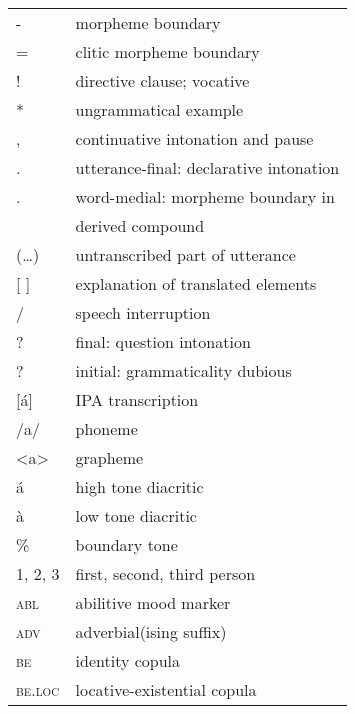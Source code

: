 \label{sec:abbr}
\begin{tabularx}{.45\textwidth}{lQ}
 {}- & morpheme boundary \\
 = & clitic morpheme boundary \\
 ! & directive clause; vocative \\
 * & ungrammatical example \\
 , & continuative intonation and pause \\
 . & utterance-final: declarative intonation \\
 . & word-medial: morpheme boundary in \\
& derived compound \\
 (…) & untranscribed part of utterance \\
{}[ ] & explanation of translated elements \\
 / & speech interruption \\
 ? & final: question intonation \\
 ? & initial: grammaticality dubious \\
{}[á] & IPA transcription \\
 /a/ & phoneme \\
 <a> & grapheme \\
 á & high tone diacritic \\
 à & low tone diacritic \\
 \% & boundary tone \\
 1, 2, 3 & first, second, third person \\
 \textsc{abl} & abilitive mood marker \\
 \textsc{adv} & adverbial(ising suffix) \\
 \textsc{be} & identity copula \\
 \textsc{be.loc} & locative-existential copula \\
\end{tabularx}
